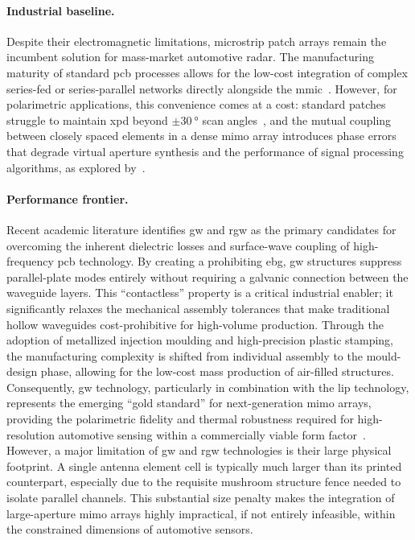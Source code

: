 \paragraph{Industrial baseline.}
Despite their electromagnetic limitations, microstrip patch arrays remain the incumbent solution for mass-market automotive radar.
The manufacturing maturity of standard \gls{pcb} processes allows for the low-cost integration of complex series-fed or series-parallel networks directly alongside the \gls{mmic}~\parencite{hartnerReliabilityPerformanceWafer2019}.
However, for polarimetric applications, this convenience comes at a cost: standard patches struggle to maintain \gls{xpd} beyond $\pm\qty{30}{\degree}$ scan angles~\parencite{yangMillimeterWaveDualPolarizedDifferentially2020}, and the mutual coupling between closely spaced elements in a dense \gls{mimo} array introduces phase errors that degrade virtual aperture synthesis and the performance of signal processing algorithms, as explored by~\textcite{arnoldEffectAntennaMutual2019}.

\paragraph{Performance frontier.}
Recent academic literature identifies \gls{gw} and \gls{rgw} as the primary candidates for overcoming the inherent dielectric losses and surface-wave coupling of high-frequency \gls{pcb} technology.
By creating a prohibiting \gls{ebg}, \gls{gw} structures suppress parallel-plate modes entirely without requiring a galvanic connection between the waveguide layers.
This \enquote{contactless} property is a critical industrial enabler; it significantly relaxes the mechanical assembly tolerances that make traditional hollow waveguides cost-prohibitive for high-volume production.
Through the adoption of metallized injection moulding and high-precision plastic stamping, the manufacturing complexity is shifted from individual assembly to the mould-design phase, allowing for the low-cost mass production of air-filled structures.
Consequently, \gls{gw} technology, particularly in combination with the \gls{lip} technology, represents the emerging \enquote{gold standard} for next-generation \gls{mimo} arrays, providing the polarimetric fidelity and thermal robustness required for high-resolution automotive sensing within a commercially viable form factor~\parencite{renGapwaveguideAutomotiveImaging2023}.
However, a major limitation of \gls{gw} and \gls{rgw} technologies is their large physical footprint.
A single antenna element cell is typically much larger than its printed counterpart, especially due to the requisite mushroom structure fence needed to isolate parallel channels.
This substantial size penalty makes the integration of large-aperture \gls{mimo} arrays highly impractical, if not entirely infeasible, within the constrained dimensions of automotive sensors.

